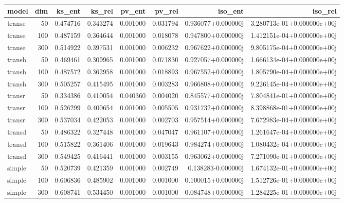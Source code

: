 \begin{tabular}{lrrrrrrr}
\toprule
   model &  dim &    ks\_ent &    ks\_rel &    pv\_ent &    pv\_rel &             iso\_ent &                     iso\_rel \\
\midrule
  transe &   50 &  0.474716 &  0.343274 &  0.001000 &  0.031794 &  0.936077+0.000000j &  3.280713e-01+0.000000e+00j \\
  transe &  100 &  0.487159 &  0.364644 &  0.001000 &  0.018078 &  0.947800+0.000000j &  1.412151e-04+0.000000e+00j \\
  transe &  300 &  0.514922 &  0.397531 &  0.001000 &  0.006232 &  0.967622+0.000000j &  9.805175e-04+0.000000e+00j \\
  transh &   50 &  0.469461 &  0.309965 &  0.001000 &  0.071830 &  0.927057+0.000000j &  1.666134e-04+0.000000e+00j \\
  transh &  100 &  0.487572 &  0.362958 &  0.001000 &  0.018893 &  0.967552+0.000000j &  1.805790e-04+0.000000e+00j \\
  transh &  300 &  0.505257 &  0.415495 &  0.001000 &  0.003283 &  0.966808+0.000000j &  9.226145e-04+0.000000e+00j \\
  transr &   50 &  0.334386 &  0.410054 &  0.040360 &  0.004020 &  0.845577+0.000000j &  7.804841e-01+0.000000e+00j \\
  transr &  100 &  0.526299 &  0.400654 &  0.001000 &  0.005505 &  0.931732+0.000000j &  8.398868e-01+0.000000e+00j \\
  transr &  300 &  0.537034 &  0.422053 &  0.001000 &  0.002703 &  0.957514+0.000000j &  7.672983e-04+0.000000e+00j \\
  transd &   50 &  0.486322 &  0.327448 &  0.001000 &  0.047047 &  0.961107+0.000000j &  1.261647e-04+0.000000e+00j \\
  transd &  100 &  0.515822 &  0.361406 &  0.001000 &  0.019643 &  0.984274+0.000000j &  1.080432e-04+0.000000e+00j \\
  transd &  300 &  0.549425 &  0.416441 &  0.001000 &  0.003155 &  0.963062+0.000000j &  7.271090e-01+0.000000e+00j \\
  simple &   50 &  0.520739 &  0.421359 &  0.001000 &  0.002749 &  0.138283-0.000000j &  1.674132e-01+0.000000e+00j \\
  simple &  100 &  0.606836 &  0.485902 &  0.001000 &  0.001000 &  0.100015+0.000000j &  1.512726e-01+0.000000e+00j \\
  simple &  300 &  0.608741 &  0.534450 &  0.001000 &  0.001000 &  0.084748+0.000000j &  1.284225e-01+0.000000e+00j \\

\end{tabular}
